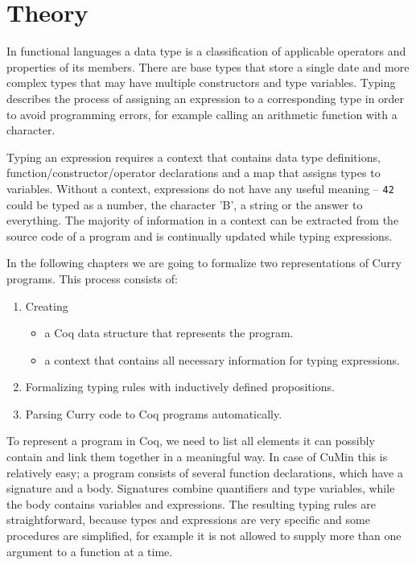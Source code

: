 \documentclass[fleqn, abstract=on]{scrreprt}
\newcommand{\coqinline}[1]{\texttt{#1}}
\begin{document}
\section{Theory}
\label{theory}
In functional languages a data type is a classification of applicable operators and properties of its members. There are base types that store a single date and more complex types that may have multiple constructors and type variables. Typing describes the process of assigning an expression to a corresponding type in order to avoid programming errors, for example calling an arithmetic function with a character.
\par
Typing an expression requires a context that contains data type definitions, function/constructor/operator declarations and a map that assigns types to variables.  Without a context, expressions do not have any useful meaning -- \coqinline{42} could be typed as a number, the character 'B', a string or the answer to everything. The majority of information in a context can be extracted from the source code of a program and is continually updated while typing expressions.
\par
In the following chapters we are going to formalize two representations of Curry programs. This process consists of:
\begin{enumerate}
	\item Creating \begin{itemize}
		              \item a Coq data structure that represents the program.
		              \item a context that contains all necessary information for typing expressions.
		           \end{itemize}
	\item Formalizing typing rules with inductively defined propositions.
	\item Parsing Curry code to Coq programs automatically.
\end{enumerate}
To represent a program in Coq, we need to list all elements it can possibly contain and link them together in a meaningful way. In case of CuMin this is relatively easy; a program consists of several function declarations, which have a signature and a body. Signatures combine quantifiers and type variables, while the body contains variables and expressions. The resulting typing rules are straightforward, because types and expressions are very specific and some procedures are simplified, for example it is not allowed to supply more than one argument to a function at a time. 
\end{document}

